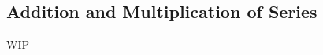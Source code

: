 \documentclass[../poma-notes.tex]{subfiles}
\begin{document}
\subsection*{Addition and Multiplication of Series}

WIP
\end{document}
